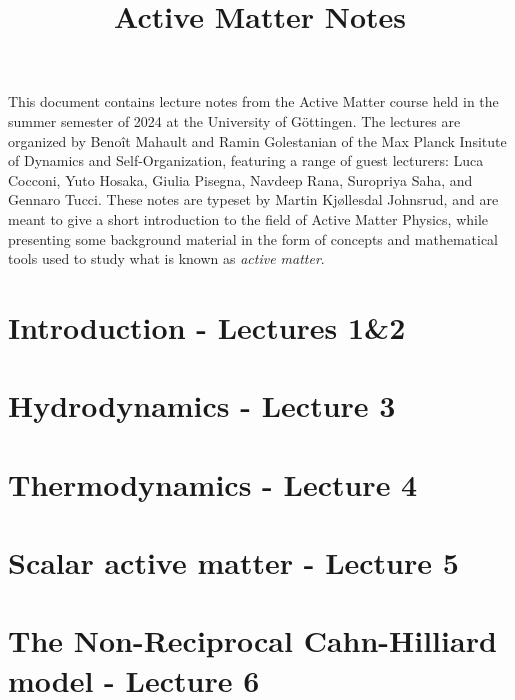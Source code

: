 \documentclass[10pt, a4paper, oneside]{book}
\title{Active Matter Notes}
\begin{document}
    \maketitle
    \clearpage


    \tableofcontents

\vspace{5cm}
This document contains lecture notes from the Active Matter course held in the summer semester of 2024 at the University of Göttingen.
The lectures are organized by Benoît Mahault and Ramin Golestanian of the Max Planck Insitute of Dynamics and Self-Organization, featuring a range of guest lecturers: Luca Cocconi, Yuto Hosaka, Giulia Pisegna, Navdeep Rana, Suropriya Saha, and Gennaro Tucci. 
These notes are typeset by Martin Kjøllesdal Johnsrud, and are meant to give a short introduction to the field of Active Matter Physics, while presenting some background material in the form of concepts and mathematical tools used to study what is known as \textit{active matter}.
    
    \clearpage

    \setlength{\parindent}{0em}
    \setlength{\parskip}{0.8em}

    \chapter{Introduction - Lectures 1\&2}
    \label{chap_intro}
    

    \chapter{Hydrodynamics - Lecture 3}
    \label{chap_hydro}
    

    \chapter{Thermodynamics - Lecture 4}
    \label{chap_thermo}
     

    \chapter{Scalar active matter - Lecture 5}
    \label{chap_scalar}
    

    \chapter{The Non-Reciprocal Cahn-Hilliard model - Lecture 6}
    \label{chap_nrch}
    
\end{document}
